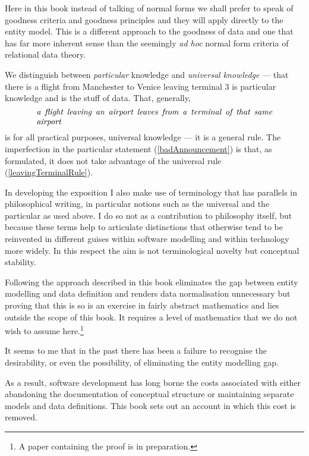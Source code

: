 Here in this book instead of talking of normal forms we shall prefer to speak of goodness criteria and goodness principles and they will apply directly to the entity model. 
This is a different approach to the goodness of data and one that has far more inherent sense than the seemingly \textit{ad hoc} normal form criteria of relational data theory.

We distinguish between \textit{particular} knowledge
 and \textit{universal knowledge} ---
that there is a flight from Manchester to Venice leaving terminal 3 is particular knowledge and is the stuff of data. That, generally, 
\begin{equation}
\label{leavingTerminalRule}
 \parbox{10cm}{\textit{a flight leaving an airport leaves from a terminal of that same airport }}
 \end{equation}
 is for all practical purposes, universal knowledge ---
 it is a general rule. 
 The imperfection in the particular statement (\ref{badAnnouncement}) is that, as formulated, 
 it does not take advantage of the universal rule  
 (\ref{leavingTerminalRule}).

In developing the exposition I also make use of terminology that has parallels in philosophical writing, in particular notions such as the universal and the particular as used above. I do so not as a contribution to philosophy itself, but because these terms help to articulate distinctions that otherwise tend to be reinvented in different guises within software modelling and within technology more widely. In this respect the aim is not terminological novelty but conceptual stability.

Following the approach described in this book eliminates the gap between entity modelling and data definition and renders data normalisation unnecessary but proving that this is so is an exercise in fairly abstract mathematics and lies outside the scope of this book. It requires a level of mathematics that we do not wish to assume here.\footnote{A paper containing the proof is in preparation.}

It seems to me that in the past there has been a failure to recognise the desirability, or even the possibility, of eliminating the entity modelling gap.

As a result, software development has long borne the costs associated with either abandoning the documentation of conceptual structure or maintaining separate models and data definitions. This book sets out an account in which this cost is removed.


